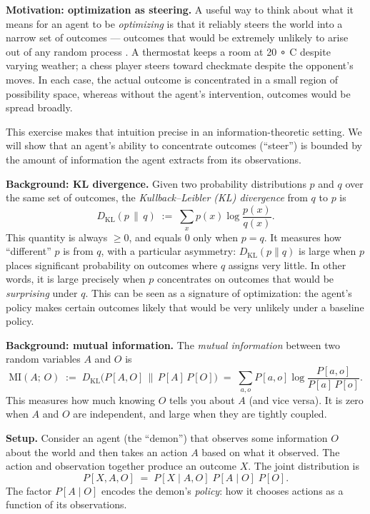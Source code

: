 \documentclass[11pt]{article}
\begin{document}
\begin{exercise}
\label{ex:do-divergence}
\noindent
\textbf{Motivation: optimization as steering.} A useful way to think about what it
means for an agent to be \emph{optimizing} is that it reliably steers the world into
a narrow set of outcomes --- outcomes that would be extremely unlikely to arise out of any random process . A thermostat keeps a room at 
20
∘
C
 despite varying weather; a
chess player steers toward checkmate despite the opponent's moves. In each case, the
actual outcome is concentrated in a small region of possibility space, whereas without
the agent's intervention, outcomes would be spread broadly.

\medskip
\noindent
This exercise makes that intuition precise in an information-theoretic setting. We
will show that an agent's ability to concentrate outcomes (``steer'') is bounded by
the amount of information the agent extracts from its observations. 

\medskip
\noindent
\textbf{Background: KL divergence.} Given two probability distributions $p$ and $q$
over the same set of outcomes, the \emph{Kullback--Leibler (KL) divergence} from $q$
to $p$ is
\[
  D_{\mathrm{KL}}(p \,\|\, q) \;:=\;
  \sum_x p(x) \log \frac{p(x)}{q(x)}.
\]
This quantity is always $\geq 0$, and equals $0$ only when $p = q$. It measures how
``different'' $p$ is from $q$, with a particular asymmetry: $D_{\mathrm{KL}}(p \| q)$
is large when $p$ places significant probability on outcomes where $q$ assigns very
little. In other words, it is large precisely when $p$ concentrates on outcomes that
would be \emph{surprising} under $q$. This can be seen as a signature of optimization:
the agent's policy makes certain outcomes likely that would be very unlikely under a
baseline policy.

\medskip
\noindent
\textbf{Background: mutual information.} The \emph{mutual information} between two
random variables $A$ and $O$ is
\[
  \mathrm{MI}(A;\, O) \;:=\;
  D_{\mathrm{KL}}\bigl(P[A, O] \,\big\|\, P[A]\,P[O]\bigr)
  \;=\; \sum_{a, o} P[a, o] \log \frac{P[a, o]}{P[a]\,P[o]}.
\]
This measures how much knowing $O$ tells you about $A$ (and vice versa). It is zero
when $A$ and $O$ are independent, and large when they are tightly coupled.

\medskip
\noindent
\textbf{Setup.} Consider an agent (the ``demon'') that observes some information $O$
about the world and then takes an action $A$ based on what it observed. The action and
observation together produce an outcome $X$. The joint distribution is
\[
  P[X, A, O] \;=\; P[X \mid A, O]\; P[A \mid O]\; P[O].
\]
The factor $P[A \mid O]$ encodes the demon's \emph{policy}: how it chooses actions as
a function of its observations.


\end{exercise}
\end{document}
